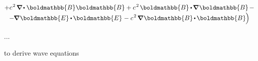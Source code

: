 \begin{multline*}
+ c^{\hspace{.16ex}2} \hspace{.3ex} \boldnabla \hspace{-0.15ex} \dotp \boldmathbb{B} \boldmathbb{B}
+ c^{\hspace{.16ex}2} \hspace{.3ex} \boldmathbb{B} \hspace{-0.1ex} \dotp \hspace{-0.22ex} \boldnabla \hspace{.2ex} \boldmathbb{B} \Bigr. \hspace{.3ex} -
\\[-0.55em]
%
- \hspace{-0.2ex} \Bigl. \boldnabla \hspace{.2ex} \boldmathbb{E} \hspace{-0.1ex} \dotp \hspace{-0.15ex} \boldmathbb{E} \hspace{.1ex}
- c^{\hspace{.16ex}2} \hspace{.3ex} \boldnabla \hspace{.2ex} \boldmathbb{B} \hspace{-0.2ex} \dotp \hspace{-0.16ex} \boldmathbb{B} \hspace{-0.1ex}
\Bigr)
\end{multline*}

...

to derive wave equations

